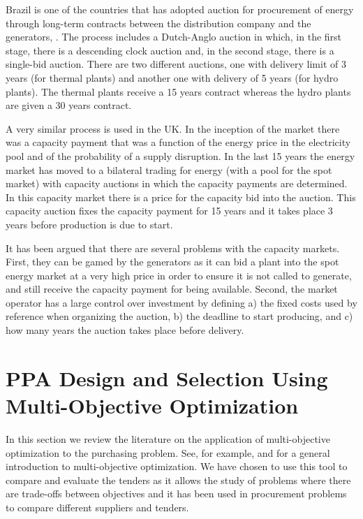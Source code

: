 \documentclass[informs]{informs3}
\begin{document}
Brazil is one of the countries that has adopted auction for procurement of energy through long-term contracts between the distribution company and the generators, \cite{Rego_Parente_2013}. The process includes a Dutch-Anglo auction in which, in the first stage, there is a descending clock auction and, in the second stage, there is a single-bid auction. There are two different auctions, one with delivery limit of 3 years (for thermal plants) and another one with delivery of 5 years (for hydro plants). The thermal plants receive a 15 years contract whereas the hydro plants are given a 30 years contract. 

A very similar process is used in the UK. In the inception of the market there was a capacity payment that was a function of the energy price in the electricity pool and of the probability of a supply disruption. In the last 15 years the energy market has moved to a bilateral trading for energy (with a pool for the spot market) with capacity auctions in which the capacity payments are determined. In this capacity market there is a price for the capacity bid into the auction. This capacity auction fixes the capacity payment for 15 years and it takes place 3 years before production is due to start. 

It has been argued that there are several problems with the capacity markets. First, they can be gamed by the generators as it can bid a plant into the spot energy market at a very high price in order to ensure it is not called to generate, and still receive the capacity payment for being available. Second, the market operator has a large control over investment by defining a) the fixed costs used by reference when organizing the auction, b) the deadline to start producing, and c) how many years the auction takes place before delivery.


\section{PPA Design and Selection Using Multi-Objective Optimization} \label{Section_MOO}
In this section we review the literature on the application of multi-objective optimization to the purchasing problem. See, for example, \cite{Ehrgott_2005} and \cite{Taha_2007} for a general introduction to multi-objective optimization. We have chosen to use this tool to compare and evaluate the tenders as it allows the study of problems where there are trade-offs between objectives and it has been used in procurement problems to compare different suppliers and tenders. 
\end{document}
